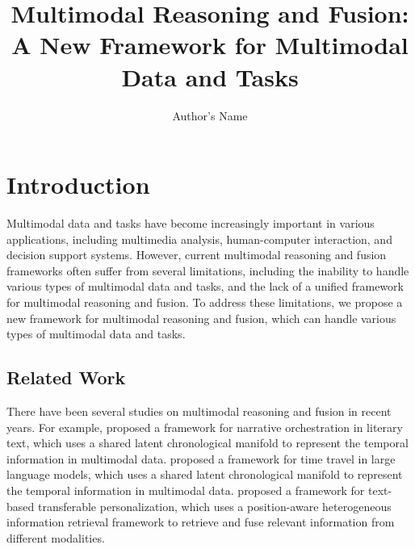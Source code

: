 \documentclass{article}
\begin{document}
\title{Multimodal Reasoning and Fusion: A New Framework for Multimodal Data and Tasks}

\author{Author's Name}

\maketitle


\section{Introduction}

Multimodal data and tasks have become increasingly important in various applications, including multimedia analysis, human-computer interaction, and decision support systems. However, current multimodal reasoning and fusion frameworks often suffer from several limitations, including the inability to handle various types of multimodal data and tasks, and the lack of a unified framework for multimodal reasoning and fusion. To address these limitations, we propose a new framework for multimodal reasoning and fusion, which can handle various types of multimodal data and tasks.

\subsection{Related Work}

There have been several studies on multimodal reasoning and fusion in recent years. For example, \citet{lu2026litvistabenchmarknarrativeorchestration} proposed a framework for narrative orchestration in literary text, which uses a shared latent chronological manifold to represent the temporal information in multimodal data. \citet{an2026timetravelengineshared} proposed a framework for time travel in large language models, which uses a shared latent chronological manifold to represent the temporal information in multimodal data. \citet{liu2026textuniversalinterfacetransferable} proposed a framework for text-based transferable personalization, which uses a position-aware heterogeneous information retrieval framework to retrieve and fuse relevant information from different modalities.
\end{document}

